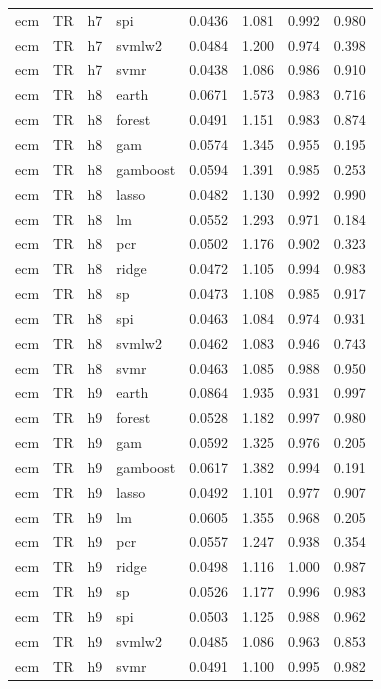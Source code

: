 \begin{ThreePartTable}
\begin{longtable}[t]{llclcccc}
ecm & TR & h7 & spi & 0.0436 & 1.081 & 0.992 & 0.980\\
ecm & TR & h7 & svmlw2 & 0.0484 & 1.200 & 0.974 & 0.398\\
ecm & TR & h7 & svmr & 0.0438 & 1.086 & 0.986 & 0.910\\
\addlinespace
ecm & TR & h8 & earth & 0.0671 & 1.573 & 0.983 & 0.716\\
ecm & TR & h8 & forest & 0.0491 & 1.151 & 0.983 & 0.874\\
ecm & TR & h8 & gam & 0.0574 & 1.345 & 0.955 & 0.195\\
ecm & TR & h8 & gamboost & 0.0594 & 1.391 & 0.985 & 0.253\\
ecm & TR & h8 & lasso & 0.0482 & 1.130 & 0.992 & 0.990\\
ecm & TR & h8 & lm & 0.0552 & 1.293 & 0.971 & 0.184\\
ecm & TR & h8 & pcr & 0.0502 & 1.176 & 0.902 & 0.323\\
ecm & TR & h8 & ridge & 0.0472 & 1.105 & 0.994 & 0.983\\
ecm & TR & h8 & sp & 0.0473 & 1.108 & 0.985 & 0.917\\
ecm & TR & h8 & spi & 0.0463 & 1.084 & 0.974 & 0.931\\
ecm & TR & h8 & svmlw2 & 0.0462 & 1.083 & 0.946 & 0.743\\
ecm & TR & h8 & svmr & 0.0463 & 1.085 & 0.988 & 0.950\\
\addlinespace
ecm & TR & h9 & earth & 0.0864 & 1.935 & 0.931 & 0.997\\
ecm & TR & h9 & forest & 0.0528 & 1.182 & 0.997 & 0.980\\
ecm & TR & h9 & gam & 0.0592 & 1.325 & 0.976 & 0.205\\
ecm & TR & h9 & gamboost & 0.0617 & 1.382 & 0.994 & 0.191\\
ecm & TR & h9 & lasso & 0.0492 & 1.101 & 0.977 & 0.907\\
ecm & TR & h9 & lm & 0.0605 & 1.355 & 0.968 & 0.205\\
ecm & TR & h9 & pcr & 0.0557 & 1.247 & 0.938 & 0.354\\
ecm & TR & h9 & ridge & 0.0498 & 1.116 & 1.000 & 0.987\\
ecm & TR & h9 & sp & 0.0526 & 1.177 & 0.996 & 0.983\\
ecm & TR & h9 & spi & 0.0503 & 1.125 & 0.988 & 0.962\\
ecm & TR & h9 & svmlw2 & 0.0485 & 1.086 & 0.963 & 0.853\\
ecm & TR & h9 & svmr & 0.0491 & 1.100 & 0.995 & 0.982\\

\end{longtable}
\end{ThreePartTable}
